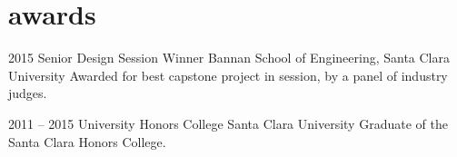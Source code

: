 \documentclass[]{friggeri-cv} %
\begin{document}

\section{awards}

\begin{entrylist}

\entry
{2015}
{Senior Design Session Winner}
{Bannan School of Engineering, Santa Clara University}
{Awarded for best capstone project in session, by a panel of industry judges.}

\entry
{2011 -- 2015}
{University Honors College}
{Santa Clara University}
{Graduate of the Santa Clara Honors College.}


\end{entrylist}
%
\end{document}
